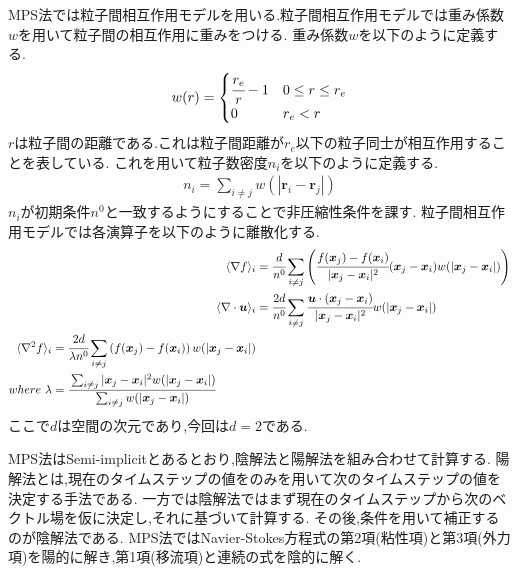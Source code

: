 \documentclass[uplatex,a4j,11pt]{jsarticle}
\begin{document}
MPS法では粒子間相互作用モデルを用いる.粒子間相互作用モデルでは重み係数$w$を用いて粒子間の相互作用に重みをつける.
重み係数$w$を以下のように定義する.\cite{sibas}\cite{MPSriron}
\begin{align}
    w(r)=\begin{cases}
        \cfrac{r_e}{r}-1&0\leq r\leq r_e\\
        0&r_e<r
    \end{cases}
\end{align}
$r$は粒子間の距離である.これは粒子間距離が$r_e$以下の粒子同士が相互作用することを表している.
これを用いて粒子数密度$n_i$を以下のように定義する.
\begin{align}
    n_i=\sum_{i\neq j}w(|\bm{r}_i-\bm{r}_j|)
\end{align}
$n_i$が初期条件$n^0$と一致するようにすることで非圧縮性条件を課す.
粒子間相互作用モデルでは各演算子を以下のように離散化する.\cite{soba}
\begin{align}
    \label{grad}
    \langle\nabla f\rangle_i&=\cfrac{d}{n^0}\sum_{i\neq j}\left(\cfrac{f(\bm{x}_j)-f(\bm{x}_i)}{|\bm{x}_j-\bm{x}_i|^2}(\bm{x}_j-\bm{x}_i)w(|\bm{x}_j-\bm{x}_i|)\right)\\
    \label{div}
    \langle\nabla\cdot \bm{u}\rangle_i&=\cfrac{2d}{n^0}\sum_{i\neq j}\cfrac{\bm{u}\cdot(\bm{x}_j-\bm{x}_i)}{|\bm{x}_j-\bm{x}_i|^2}w(|\bm{x}_j-\bm{x}_i|)\\
    \label{lap}
    \begin{split}
    \langle\nabla^2 f\rangle_i&=\cfrac{2d}{\lambda n^0}\sum_{i\neq j}\left(f(\bm{x}_j)-f(\bm{x}_i)\right)w(|\bm{x}_j-\bm{x}_i|)\\
    where~\lambda&=\cfrac{\sum_{i\neq j}|\bm{x}_j-\bm{x}_i|^2w(|\bm{x}_j-\bm{x}_i|)}{\sum_{i\neq j}w(|\bm{x}_j-\bm{x}_i|)}
    \end{split}
\end{align}
ここで$d$は空間の次元であり,今回は$d=2$である.

MPS法はSemi-implicitとあるとおり,陰解法と陽解法を組み合わせて計算する.
陽解法とは,現在のタイムステップの値をのみを用いて次のタイムステップの値を決定する手法である.
一方では陰解法ではまず現在のタイムステップから次のベクトル場を仮に決定し,それに基づいて計算する.
その後,条件を用いて補正するのが陰解法である.
MPS法ではNavier-Stokes方程式の第2項(粘性項)と第3項(外力項)を陽的に解き,第1項(移流項)と連続の式を陰的に解く.
\end{document}
